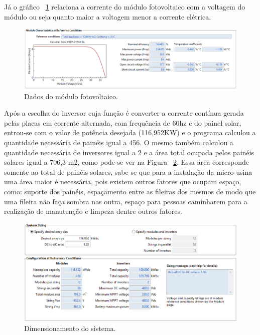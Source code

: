 Já o gráfico ~\ref{fig:smartgrid2} relaciona a corrente do módulo fotovoltaico com a voltagem do módulo ou seja quanto maior a voltagem menor a corrente elétrica.

\begin{figure}[!h]
  \centering
  \includegraphics[keepaspectratio=true,scale=0.4]{figuras/smartgrid2.eps}
  \caption{ Dados do módulo fotovoltaico.}
  \label{fig:smartgrid2}
\end{figure}

Após a escolha do inversor cuja função é converter a corrente contínua gerada pelas placas em corrente alternada, com frequência de 60hz e do painel solar, entrou-se com o valor de potência desejada (116,952KW) e o programa calculou a quantidade necessária de painéis igual a 456. O mesmo também calculou a quantidade necessária de inversores igual a 2 e a área total ocupada pelos painéis solares igual a 706,3 m2, como pode-se ver na Figura ~\ref{fig:estimativa_paineis}. Essa área corresponde somente ao total de painéis solares, sabe-se que para a instalação da micro-usina uma área maior é necessária, pois existem outros fatores que ocupam espaço, como: suporte dos painéis, espaçamento entre as fileiras dos mesmos de modo que uma fileira não faça sombra nas outra, espaço para pessoas caminharem para a realização de manutenção e limpeza dentre outros fatores.

\begin{figure}[!h]
  \centering
  \includegraphics[keepaspectratio=true,scale=0.5]{figuras/estimativa_paineis.eps}
  \caption{Dimensionamento do sistema.}
  \label{fig:estimativa_paineis}
\end{figure}

